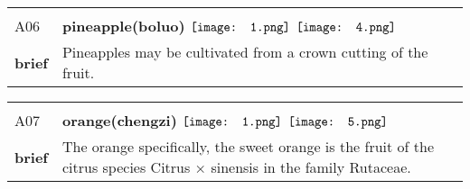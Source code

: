 \documentclass[UTF8]{article}
\begin{document}
            \begin{tabularx}{\textwidth}{p{1.5cm}X}
            \arrayrulecolor{myBlue}
        	\hline\\
            \small{A06}&
            \large{\bfseries{pineapple(boluo)}}\hfill
                                                $\vcenter{\hbox{\texttt{[image: 1.png]}}}$
                                                                \phantom{$\vcenter{\hbox{\texttt{[image: 2.png]}}}$}
                                                                \phantom{$\vcenter{\hbox{\texttt{[image: 3.png]}}}$}
                                                                $\vcenter{\hbox{\texttt{[image: 4.png]}}}$
                                                                \phantom{$\vcenter{\hbox{\texttt{[image: 5.png]}}}$}
                                                                \phantom{$\vcenter{\hbox{\texttt{[image: 6.png]}}}$}
                                                                \phantom{$\vcenter{\hbox{\texttt{[image: 7.png]}}}$}
                                        \\[10pt]
            \large{\bfseries{brief}}&\noindent\parbox[c]{\hsize}{Pineapples may be cultivated from a crown cutting of the fruit.} \\[5pt]
            \hline\\[-10pt]
        \end{tabularx}
            \begin{tabularx}{\textwidth}{p{1.5cm}X}
            \arrayrulecolor{myBlue}
        	\hline\\
            \small{A07}&
            \large{\bfseries{orange(chengzi)}}\hfill
                                                $\vcenter{\hbox{\texttt{[image: 1.png]}}}$
                                                                \phantom{$\vcenter{\hbox{\texttt{[image: 2.png]}}}$}
                                                                \phantom{$\vcenter{\hbox{\texttt{[image: 3.png]}}}$}
                                                                \phantom{$\vcenter{\hbox{\texttt{[image: 4.png]}}}$}
                                                                $\vcenter{\hbox{\texttt{[image: 5.png]}}}$
                                                                \phantom{$\vcenter{\hbox{\texttt{[image: 6.png]}}}$}
                                                                \phantom{$\vcenter{\hbox{\texttt{[image: 7.png]}}}$}
                                        \\[10pt]
            \large{\bfseries{brief}}&\noindent\parbox[c]{\hsize}{The orange specifically, the sweet orange is the fruit of the citrus species Citrus × sinensis in the family Rutaceae.} \\[5pt]
            \hline\\[-10pt]
        \end{tabularx}
\end{document}
